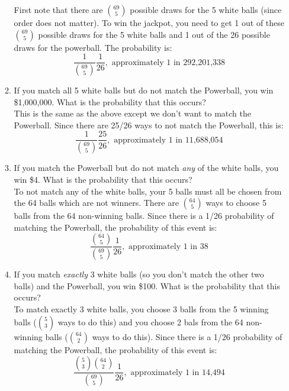 \documentclass[12pt]{article}
\begin{document}
\begin{enumerate}
\begin{enumerate}
First note that there are $\binom{69}{5}$ possible draws for the 5 white balls (since order does not matter). To win the jackpot, you need to get 1 out of these $\binom{69}{5}$ possible draws for the 5 white balls and 1 out of the 26 possible draws for the powerball. The probability is:
\[
\frac{1}{\binom{69}{5}}\frac{1}{26}, \text{  approximately 1 in 292,201,338}
\]

\item If you match all 5 white balls but do not match the Powerball, you win \$1,000,000. What is the probability that this occurs?\\

This is the same as the above except we don't want to match the Powerball. Since there are 25/26 ways to not match the Powerball, this is:
\[
\frac{1}{\binom{69}{5}}\frac{25}{26}, \text{  approximately 1 in 11,688,054}
\]

\item If you match the Powerball but do not match \emph{any} of the white balls, you win \$4. What is the probability that this occurs?\\

To not match any of the white balls, your 5 balls must all be chosen from the 64 balls which are not winners. There are $\binom{64}{5}$ ways to choose 5 balls from the 64 non-winning balls. Since there is a 1/26 probability of matching the Powerball, the probability of this event is:
\[
\frac{ \binom{64}{5} }{\binom{69}{5}}\frac{1}{26}, \text{  approximately 1 in 38}
\]

\item If you match \emph{exactly} 3 white balls (so you don't match the other two balls) and the Powerball, you win \$100. What is the probability that this occurs?\\

To match exactly 3 white balls, you choose 3 balls from the 5 winning balls ($\binom{5}{3}$ ways to do this) and you choose 2 bals from the 64 non-winning balls ($\binom{64}{2}$ ways to do this). Since there is a 1/26 probability of matching the Powerball, the probability of this event is:
\[
\frac{ \binom{5}{3} \binom{64}{2} }{\binom{69}{5}}\frac{1}{26}, \text{  approximately 1 in 14,494}
\]

\end{enumerate}

\end{enumerate}
\end{document}
